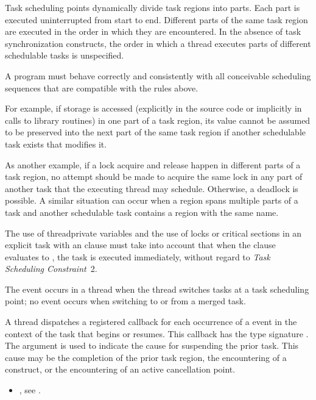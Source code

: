 \begin{note}
Task scheduling points dynamically divide task regions into parts. Each part is
executed uninterrupted from start to end. Different parts of the same task region are
executed in the order in which they are encountered. In the absence of task
synchronization constructs, the order in which a thread executes parts of different
schedulable tasks is unspecified.

A program must behave correctly and consistently with all conceivable
scheduling sequences that are compatible with the rules above.

For example, if  storage is accessed (explicitly in the 
source code or implicitly in calls to library routines) in one part of a task 
region, its value cannot be assumed to be preserved into the next part of the 
same task region if another schedulable task exists that modifies it.

As another example, if a lock acquire and release happen in different parts of a task
region, no attempt should be made to acquire the same lock in any part of another task
that the executing thread may schedule. Otherwise, a deadlock is possible. A similar
situation can occur when a  region spans multiple parts of a task and 
another schedulable task contains a  region with the same name.

The use of threadprivate variables and the use of locks or critical sections in an 
explicit task with an  clause must take into account that when the  
clause evaluates to , the task is executed immediately, without regard to 
\emph{Task Scheduling Constraint}~2.
\end{note}

\events

The  event occurs in a thread when the thread switches tasks at 
a task scheduling point; no event occurs when switching to or from a merged task.

\tools

A thread dispatches a registered  callback for 
each occurrence of a  event in the context of the task that 
begins or resumes. This callback has the type signature 
. The argument   is 
used to indicate the cause for suspending the prior task. This cause may be the 
completion of the prior task region, the encountering of a  
construct, or the encountering of an active cancellation point.

\crossreferences
\begin{itemize}
\item {}, see
.
\end{itemize}
